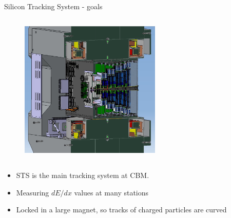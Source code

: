 \begin{columnframe}{Silicon Tracking System - goals}
    \begin{column}{0.5\textwidth}
        \begin{figure}
            \centering
            \includegraphics[width=0.6\textwidth, frame]{images/sts_render.png}
        \end{figure}
    \end{column}
    \begin{column}{0.5\textwidth}
        \begin{itemize}
            \item STS is the main tracking system at CBM.
            \item Measuring $dE/dx$ values at many stations
            \item Locked in a large magnet, so tracks of charged particles are curved
        \end{itemize}
    \end{column}
\end{columnframe}

